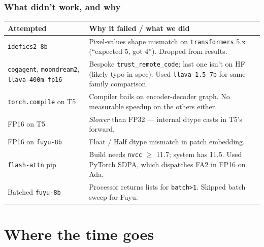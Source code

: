 \documentclass[
	11pt,
	aspectratio=169,
]{beamer}
\begin{document}
\begin{frame}
	\frametitle{What didn't work, and why}

	\scriptsize
	\begin{tabular}{@{}p{}p{}@{}}
		\toprule
		\textbf{Attempted} & \textbf{Why it failed / what we did} \\
		\midrule
		\texttt{idefics2-8b} &
			Pixel-values shape mismatch on \texttt{transformers} 5.x (``expected 5, got 4''). Dropped from results. \\
		\texttt{cogagent}, \texttt{moondream2}, \texttt{llava-400m-fp16} &
			Bespoke \texttt{trust\_remote\_code}; last one isn't on HF (likely typo in spec). Used \texttt{llava-1.5-7b} for same-family comparison. \\
		\texttt{torch.compile} on T5 &
			Compiler bails on encoder-decoder graph. No measurable speedup on the others either. \\
		FP16 on T5 &
			\emph{Slower} than FP32 — internal dtype casts in T5's forward. \\
		FP16 on \texttt{fuyu-8b} &
			Float / Half dtype mismatch in patch embedding. \\
		\texttt{flash-attn} pip & Build needs \texttt{nvcc} $\geq$ 11.7; system has 11.5. Used PyTorch SDPA, which dispatches FA2 in FP16 on Ada. \\
		Batched \texttt{fuyu-8b} & Processor returns lists for \texttt{batch>1}. Skipped batch sweep for Fuyu. \\
		\bottomrule
	\end{tabular}
\end{frame}

\section{Where the time goes}
\end{document}
